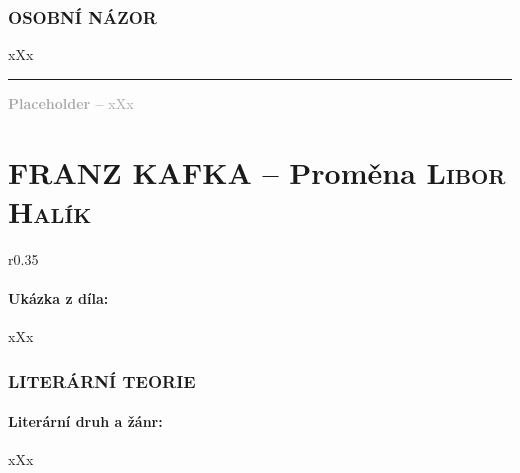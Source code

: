 \documentclass[A4paper]{extarticle} %
\begin{document}


\section*{OSOBNÍ NÁZOR}
\noindent 
xXx

\vfill

\noindent\begin{minipage}{\textwidth}
    \textcolor{darkgray}{\rule{\linewidth}{0.4pt}
    \footnotesize
    \textbf{Placeholder --} xXx
    }
\end{minipage}

\newpage


\changefontsize{8pt}

\part*{FRANZ KAFKA -- Proměna {\hfill \normalfont\tiny\textsc{Libor Halík}}}

\noindent\begin{wrapfigure}{r}{0.35\textwidth}
\tiny

\subsection*{Ukázka z díla:}
\setlength{\parindent}{3pt}
xXx
\end{wrapfigure}

\section*{LITERÁRNÍ TEORIE}

\subsection*{Literární druh a žánr:}
\noindent xXx


\end{document}
